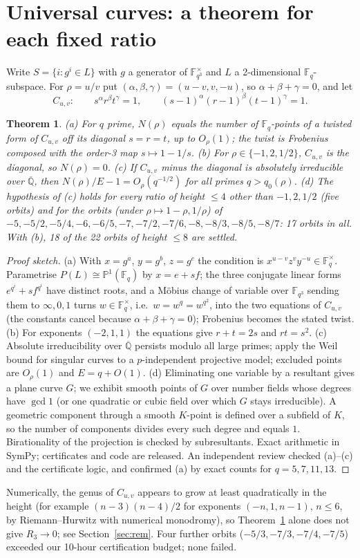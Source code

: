 \documentclass[11pt]{article}
\newtheorem{theorem}{Theorem}
\begin{document}
\section{Universal curves: a theorem for each fixed ratio}
Write $S=\{i:g^i\in L\}$ with $g$ a generator of $\mathbb F_{q^3}^\times$ and $L$ a 2-dimensional $\mathbb F_q$-subspace. For
$\rho=u/v$ put $(\alpha,\beta,\gamma)=(u-v,v,-u)$, so $\alpha+\beta+\gamma=0$, and let
\[C_{u,v}:\qquad s^\alpha r^\beta t^\gamma=1,\qquad (s-1)^\alpha(r-1)^\beta(t-1)^\gamma=1 .\]
\begin{theorem}\label{thm:curve}
(a) For $q$ prime, $N(\rho)$ equals the number of $\mathbb F_q$-points of a twisted form of $C_{u,v}$ off its diagonal $s=r=t$, up to
$O_\rho(1)$; the twist is Frobenius composed with the order-3 map $s\mapsto1-1/s$.
(b) For $\rho\in\{-1,2,1/2\}$, $C_{u,v}$ is the diagonal, so $N(\rho)=0$.
(c) If $C_{u,v}$ minus the diagonal is absolutely irreducible over $\overline{\mathbb Q}$, then $N(\rho)/E-1=O_\rho(q^{-1/2})$ for all
primes $q>q_0(\rho)$.
(d) The hypothesis of (c) holds for every ratio of height $\le4$ other than $-1,2,1/2$ (five orbits) and for the orbits (under $\rho\mapsto1-\rho,1/\rho$) of
$-5,-5/2,-5/4,-6,-6/5,-7,-7/2,-7/6,-8,-8/3,-8/5,-8/7$: 17 orbits in all. With (b), 18 of the 22 orbits of height $\le8$ are settled.
\end{theorem}
\begin{proof}[Proof sketch]
(a) With $x=g^a$, $y=g^b$, $z=g^c$ the condition is $x^{u-v}z^{v}y^{-u}\in\mathbb F_q^\times$. Parametrise $P(L)\cong\mathbb P^1(\mathbb F_q)$
by $x=e+sf$; the three conjugate linear forms $e^{q^i}+sf^{q^i}$ have distinct roots, and a M\"obius change of variable over
$\mathbb F_{q^3}$ sending them to $\infty,0,1$ turns $w\in\mathbb F_q^\times$, i.e.\ $w=w^q=w^{q^2}$, into the two equations of
$C_{u,v}$ (the constants cancel because $\alpha+\beta+\gamma=0$); Frobenius becomes the stated twist. (b) For exponents $(-2,1,1)$ the
equations give $r+t=2s$ and $rt=s^2$. (c) Absolute irreducibility over $\overline{\mathbb Q}$ persists modulo all large primes; apply the
Weil bound for singular curves \cite{AP} to a $p$-independent projective model; excluded points are $O_\rho(1)$ and $E=q+O(1)$.
(d) Eliminating one variable by a resultant gives a plane curve $G$; we exhibit smooth points of $G$ over number fields whose degrees
have $\gcd1$ (or one quadratic or cubic field over which $G$ stays irreducible). A geometric component through a smooth $K$-point is
defined over a subfield of $K$, so the number of components divides every such degree and equals $1$. Birationality of the projection
is checked by subresultants. Exact arithmetic in SymPy; certificates and code are released. An independent review checked (a)--(c)
and the certificate logic, and confirmed (a) by exact counts for $q=5,7,11,13$.
\end{proof}
Numerically, the genus of $C_{u,v}$ appears to grow at least quadratically in the height (for example $(n-3)(n-4)/2$ for exponents $(-n,1,n-1)$, $n\le6$,
by Riemann--Hurwitz with numerical monodromy), so Theorem~\ref{thm:curve} alone does not give $R_3\to0$; see Section~\ref{sec:rem}.
Four further orbits ($-5/3,-7/3,-7/4,-7/5$) exceeded our 10-hour certification budget; none failed.
\end{document}

